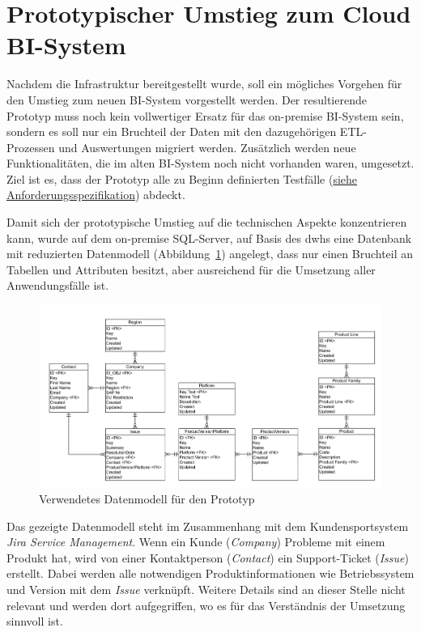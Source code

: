 \section{Prototypischer Umstieg zum Cloud BI-System} \label{sec:praktischeUmsetzung:Migration}
Nachdem die Infrastruktur bereitgestellt wurde, soll ein mögliches Vorgehen für den Umstieg zum neuen BI-System vorgestellt werden. Der resultierende Prototyp muss noch kein vollwertiger Ersatz für das on-premise BI-System sein, sondern es soll nur ein Bruchteil der Daten mit den dazugehörigen ETL-Prozessen und Auswertungen migriert werden. Zusätzlich werden neue Funktionalitäten, die im alten BI-System noch nicht vorhanden waren, umgesetzt. Ziel ist es, dass der Prototyp alle zu Beginn definierten Testfälle (\hyperref[sec:anforderungsspezifikation:funktionaleAnforderungen]{siehe Anforderungsspezifikation}) abdeckt.

Damit sich der prototypische Umstieg auf die technischen Aspekte konzentrieren kann, wurde auf dem on-premise SQL-Server, auf Basis des \acp{dwh} eine Datenbank mit reduzierten Datenmodell (Abbildung~\ref{fig:praktischeUmsetzung:dataModel}) angelegt, dass nur einen Bruchteil an Tabellen und Attributen besitzt, aber ausreichend für die Umsetzung aller Anwendungsfälle ist. 

\begin{figure}[htbp]
 \centering
 \includegraphics[width=\textwidth]{gfx/data_model.png}
 \caption{Verwendetes Datenmodell für den Prototyp}
\label{fig:praktischeUmsetzung:dataModel}
\end{figure}

\noindent Das gezeigte Datenmodell steht im Zusammenhang mit dem Kundensportsystem \textit{Jira Service Management}. Wenn ein Kunde (\textit{Company}) Probleme mit einem Produkt hat, wird von einer Kontaktperson (\textit{Contact}) ein Support-Ticket (\textit{Issue}) erstellt. Dabei werden alle notwendigen Produktinformationen wie Betriebssystem und Version mit dem \textit{Issue} verknüpft. Weitere Details sind an dieser Stelle nicht relevant und werden dort aufgegriffen, wo es für das Verständnis der Umsetzung sinnvoll ist.


